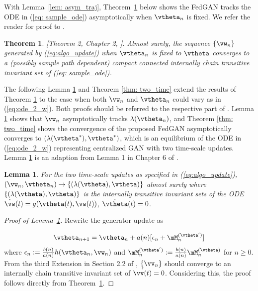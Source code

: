 \documentclass{article}
\newtheorem{theorem}{Theorem}
\newtheorem{lemma}{Lemma}
\def\lemref#1{Lemma~\ref{#1}}
\def\thmref#1{Theorem~\ref{#1}}
\begin{document}
	With  \lemref{lem: asym_traj}, \thmref{thm: single_converge} below shows the FedGAN tracks the ODE in (\ref{eq: sample_ode}) asymptotically when ${\vtheta}_{n}$ is fixed. We refer the reader for proof to \citep{borkar2009stochastic}.  
	\begin{theorem}
		\label{thm: single_converge}
		[Theorem 2, Chapter 2, \citep{borkar2009stochastic}]. Almost surely, the sequence $\{\vw_n\}$ generated by  (\ref{eq:algo_update}) when ${\vtheta}_{n}$ is fixed to ${\vtheta}$ converges to a (possibly sample path dependent) compact connected internally chain transitive invariant set of (\ref{eq: sample_ode}). 
	\end{theorem}
The following Lemma \ref{lem: trans_invar} and Theorem \ref{thm: two_time} extend the results of Theorem \ref{thm: single_converge} to the case when both ${\vw}_{n}$ and ${\vtheta}_{n}$ could vary as in (\ref{eq:ode_2_w}). Both proofs should be referred to the respective part of \citep{borkar2009stochastic}.  Lemma \ref{lem: trans_invar} shows that $\vw_n$ asymptotically tracks $\lambda(\vtheta_n)$, and Theorem \ref{thm: two_time} shows the convergence of the proposed FedGAN asymptotically converges to $(\lambda(\vtheta^*), \vtheta^*)$, which is an equilibrium of the ODE in (\ref{eq:ode_2_w})  representing centralized GAN with two time-scale updates. Lemma \ref{lem: trans_invar} is an adaption from Lemma 1 in Chapter 6 of \citep{borkar2009stochastic}.
 	\begin{lemma}
	\label{lem: trans_invar}
		 For the two time-scale updates as specified in (\ref{eq:algo_update}), $(\vw_n,\vtheta_n)\rightarrow \{(\lambda(\vtheta), \vtheta)\}$ almost surely where $\{(\lambda(\vtheta), \vtheta)\}$ is the internally transitive invariant sets of the ODE $\dot{\vw}(t)=g(\vtheta(t),\vw(t))$, $\dot{\vtheta}(t)=0$.
	\end{lemma}
	
	\begin{proof}[Proof of \lemref{lem: trans_invar}]

			Rewrite the generator update as 
			
			\begin{equation}
			{\vtheta}_{n+1}= {\vtheta}_{n}+a(n)[\epsilon_n+{\mM}_{n}^{(\vtheta')}]
			\end{equation}
			where $\epsilon_n:=\frac{b(n)}{a(n)}{h}({\vtheta}_{n},{\vw}_{n})$ and ${\mM}_{n}^{(\vtheta')}:=\frac{b(n)}{a(n)}{\mM}_{n}^{(\vtheta)}$ for $n\geq 0$. From the third Extension in Section 2.2 of \citep{borkar2009stochastic}, $\{\vv_n\}$ should converge to an internally chain transitive invariant set of $\dot{\vv(t)}=0$. Considering this, the proof follows directly from \thmref{thm: single_converge}.
	\end{proof}
	
\end{document}
